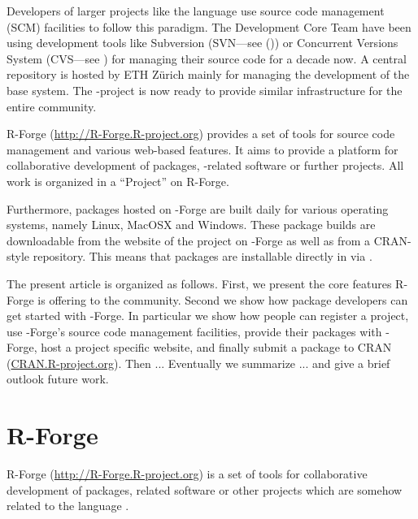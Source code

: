 Developers of larger projects like the language \R{} use source code
management (SCM) facilities to follow this paradigm.
The \R{} Development Core Team have been using
development tools like Subversion (SVN---see
(\citep{forge:Pilato+Collins-Sussman+Fitzpatrick:2004})) or 
Concurrent Versions System (CVS---see \citep{forge:Cederqvist:2006})
for managing their source code for a decade now.  
A central repository is hosted by ETH Z\"urich mainly for
managing the development of the base \R{} system. The
\R{}-project is now ready to provide similar infrastructure
for the entire \R{} community.

R-Forge (\url{http://R-Forge.R-project.org}) provides a set of tools
for source code management and various web-based
features. It aims to provide a platform for collaborative development of
\R{} packages, \R{}-related software or further projects.
All work is organized in a ``Project'' on R-Forge. 



Furthermore, packages hosted on \R{}-Forge are built daily
for  various operating systems, namely Linux, MacOSX and Windows. These
package builds are downloadable from the website of the project on
\R{}-Forge as well as from a CRAN-style repository. This means that
packages are installable directly in \R{} via
.

The present article is organized as follows. First, we present the core
features R-Forge is offering to the \R{} community. Second we
show how package developers can get started with 
\R{}-Forge. In particular we show how people can register a project, 
use \R{}-Forge's source code management facilities, provide their
packages with \R{}-Forge, host a project specific website, and
finally submit a package to CRAN (\url{CRAN.R-project.org}). Then ...
Eventually we summarize ... and give a brief outlook future work.


\section{R-Forge}
R-Forge (\url{http://R-Forge.R-project.org}) is a set of tools for
collaborative development of \R{} packages, \R{}
related software or other projects which are somehow related to the
language \R{}.

